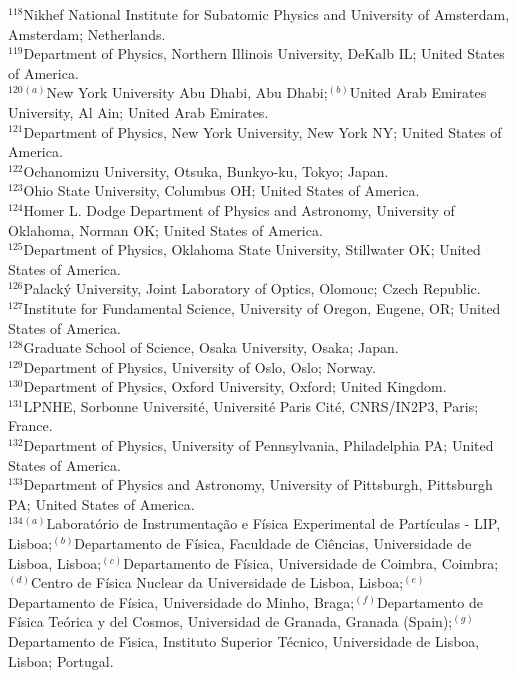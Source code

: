 \begin{flushleft}
$^{118}$Nikhef National Institute for Subatomic Physics and University of Amsterdam, Amsterdam; Netherlands.\\
$^{119}$Department of Physics, Northern Illinois University, DeKalb IL; United States of America.\\
$^{120}$$^{(a)}$New York University Abu Dhabi, Abu Dhabi;$^{(b)}$United Arab Emirates University, Al Ain; United Arab Emirates.\\
$^{121}$Department of Physics, New York University, New York NY; United States of America.\\
$^{122}$Ochanomizu University, Otsuka, Bunkyo-ku, Tokyo; Japan.\\
$^{123}$Ohio State University, Columbus OH; United States of America.\\
$^{124}$Homer L. Dodge Department of Physics and Astronomy, University of Oklahoma, Norman OK; United States of America.\\
$^{125}$Department of Physics, Oklahoma State University, Stillwater OK; United States of America.\\
$^{126}$Palack\'y University, Joint Laboratory of Optics, Olomouc; Czech Republic.\\
$^{127}$Institute for Fundamental Science, University of Oregon, Eugene, OR; United States of America.\\
$^{128}$Graduate School of Science, Osaka University, Osaka; Japan.\\
$^{129}$Department of Physics, University of Oslo, Oslo; Norway.\\
$^{130}$Department of Physics, Oxford University, Oxford; United Kingdom.\\
$^{131}$LPNHE, Sorbonne Universit\'e, Universit\'e Paris Cit\'e, CNRS/IN2P3, Paris; France.\\
$^{132}$Department of Physics, University of Pennsylvania, Philadelphia PA; United States of America.\\
$^{133}$Department of Physics and Astronomy, University of Pittsburgh, Pittsburgh PA; United States of America.\\
$^{134}$$^{(a)}$Laborat\'orio de Instrumenta\c{c}\~ao e F\'isica Experimental de Part\'iculas - LIP, Lisboa;$^{(b)}$Departamento de F\'isica, Faculdade de Ci\^{e}ncias, Universidade de Lisboa, Lisboa;$^{(c)}$Departamento de F\'isica, Universidade de Coimbra, Coimbra;$^{(d)}$Centro de F\'isica Nuclear da Universidade de Lisboa, Lisboa;$^{(e)}$Departamento de F\'isica, Universidade do Minho, Braga;$^{(f)}$Departamento de F\'isica Te\'orica y del Cosmos, Universidad de Granada, Granada (Spain);$^{(g)}$Departamento de F\'{\i}sica, Instituto Superior T\'ecnico, Universidade de Lisboa, Lisboa; Portugal.\\

\end{flushleft}
